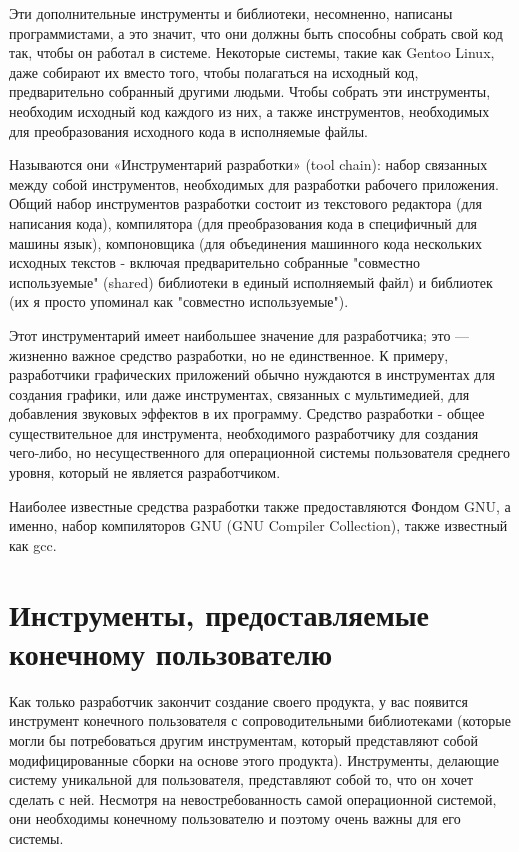 \documentclass[10pt]{book}
\begin{document}
Эти дополнительные инструменты и библиотеки, несомненно, написаны программистами, а это значит, что они должны быть способны собрать свой код так, чтобы он работал в системе. Некоторые системы, такие как Gentoo Linux, даже собирают их вместо того, чтобы полагаться на исходный код, предварительно собранный другими людьми. Чтобы собрать эти инструменты, необходим исходный код каждого из них,  а также инструментов, необходимых для преобразования исходного кода в исполняемые файлы.

Называются они «Инструментарий разработки» (tool chain): набор связанных между собой инструментов, необходимых для разработки рабочего приложения. Общий набор инструментов разработки состоит из текстового редактора (для написания кода), компилятора (для преобразования кода в специфичный для машины язык), компоновщика (для объединения машинного кода нескольких исходных текстов - включая предварительно собранные "совместно используемые"{} (shared) библиотеки в единый исполняемый файл) и библиотек (их я просто упоминал как "совместно используемые").

Этот инструментарий имеет наибольшее значение для разработчика; это — жизненно важное средство разработки, но не единственное. К примеру, разработчики графических приложений обычно нуждаются в инструментах для создания графики, или даже инструментах, связанных с мультимедией, для добавления звуковых эффектов в их программу. Средство разработки - общее существительное для инструмента, необходимого разработчику для создания чего-либо, но несущественного для операционной системы пользователя среднего уровня, который не является разработчиком.

Наиболее известные средства разработки также предоставляются Фондом GNU, а именно, набор компиляторов GNU (GNU Compiler Collection), также известный как gcc.

\section{Инструменты, предоставляемые конечному пользователю}

Как только разработчик закончит создание своего продукта, у вас появится инструмент конечного пользователя с сопроводительными библиотеками (которые могли бы потребоваться другим инструментам, который представляют собой модифицированные сборки на основе этого продукта). Инструменты, делающие систему уникальной для пользователя, представляют собой то, что он хочет сделать с ней. Несмотря на невостребованность самой  операционной системой, они необходимы конечному пользователю и поэтому очень важны для его системы.
\end{document}
